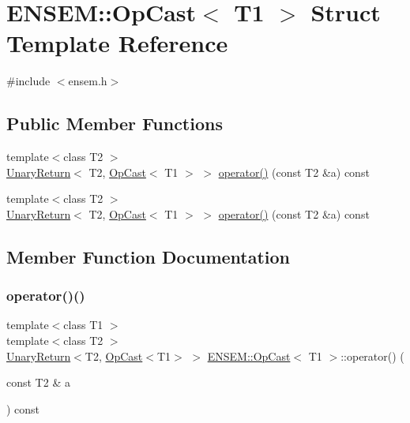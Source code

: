 \hypertarget{structENSEM_1_1OpCast}{}\section{E\+N\+S\+EM\+:\+:Op\+Cast$<$ T1 $>$ Struct Template Reference}
\label{structENSEM_1_1OpCast}


{\ttfamily \#include $<$ensem.\+h$>$}

\subsection*{Public Member Functions}
\begin{DoxyCompactItemize}
\item 
{\footnotesize template$<$class T2 $>$ }\\\mbox{\hyperlink{structENSEM_1_1UnaryReturn}{Unary\+Return}}$<$ T2, \mbox{\hyperlink{structENSEM_1_1OpCast}{Op\+Cast}}$<$ T1 $>$ $>$ \mbox{\hyperlink{structENSEM_1_1OpCast_a330c92c529ef7bba55e2b3cbbbf0c81a}{operator()}} (const T2 \&a) const
\item 
{\footnotesize template$<$class T2 $>$ }\\\mbox{\hyperlink{structENSEM_1_1UnaryReturn}{Unary\+Return}}$<$ T2, \mbox{\hyperlink{structENSEM_1_1OpCast}{Op\+Cast}}$<$ T1 $>$ $>$ \mbox{\hyperlink{structENSEM_1_1OpCast_a330c92c529ef7bba55e2b3cbbbf0c81a}{operator()}} (const T2 \&a) const
\end{DoxyCompactItemize}


\subsection{Member Function Documentation}
\mbox{\label{structENSEM_1_1OpCast_a330c92c529ef7bba55e2b3cbbbf0c81a}} 
\subsubsection{\texorpdfstring{operator()()}{operator()()}\hspace{0.1cm}{\footnotesize\ttfamily [1/2]}}
{\footnotesize\ttfamily template$<$class T1 $>$ \\
template$<$class T2 $>$ \\
\mbox{\hyperlink{structENSEM_1_1UnaryReturn}{Unary\+Return}}$<$T2, \mbox{\hyperlink{structENSEM_1_1OpCast}{Op\+Cast}}$<$T1$>$ $>$ \mbox{\hyperlink{structENSEM_1_1OpCast}{E\+N\+S\+E\+M\+::\+Op\+Cast}}$<$ T1 $>$\+::operator() (\begin{DoxyParamCaption}\item[{const T2 \&}]{a }\end{DoxyParamCaption}) const\hspace{0.3cm}{\ttfamily [inline]}}

